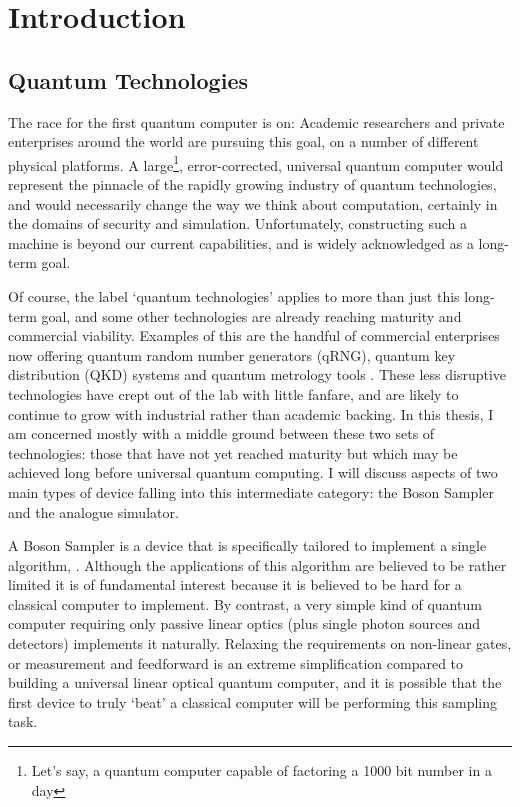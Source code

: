 \chapter{Introduction}
\label{ch:Introduction}
\section{Quantum Technologies}
\label{sec:Science}
The race for the first quantum computer is on: Academic researchers and private
enterprises \cite{dwave} around the world are pursuing this goal, on a number of
different physical platforms. A large\footnote{Let's say, a quantum computer
capable of factoring a 1000 bit number in a day}, error-corrected, universal
quantum computer would represent the pinnacle of the rapidly growing industry
of quantum technologies, and would necessarily change the way we think about
computation, certainly in the domains of security and simulation. Unfortunately,
constructing such a machine is beyond our current capabilities, and is widely
acknowledged as a long-term goal.

Of course, the label `quantum technologies' applies to more than just this
long-term goal, and some other technologies are already reaching maturity and
commercial viability. Examples of this are the handful of commercial enterprises
now offering quantum random number generators (qRNG), quantum key distribution
(QKD) systems and quantum metrology tools \cite{idquantique, magiq, qutools}.
These less disruptive technologies have crept out of the lab with little
fanfare, and are likely to continue to grow with industrial rather than
academic backing. In this thesis, I am concerned mostly with a middle ground
between these two sets of technologies: those that have not yet reached maturity
but which may be achieved long before universal quantum computing. I will
discuss aspects of two main types of device falling into this intermediate
category: the Boson Sampler and the analogue simulator. 

A Boson Sampler is a device that is specifically tailored to implement a
single algorithm, \bosonsampling{}. Although the applications of this algorithm
are believed to be rather limited it is of fundamental interest because it is
believed to be hard for a classical computer to implement. By contrast, a very
simple kind of quantum computer requiring only passive linear optics (plus
single photon sources and detectors) implements it naturally. Relaxing the
requirements on non-linear gates, or measurement and feedforward is an extreme
simplification compared to building a universal linear optical quantum computer,
and it is possible that the first device to truly `beat' a classical computer
will be performing this sampling task.

